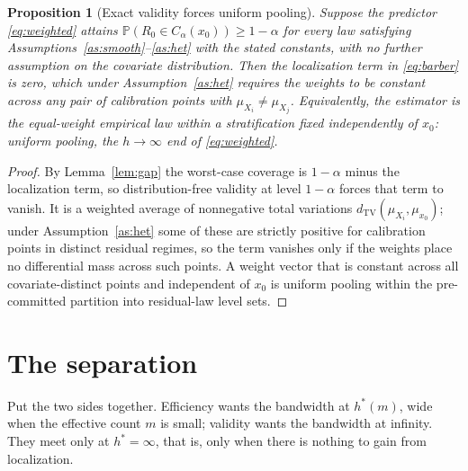 \documentclass[11pt]{article}
\newtheorem{proposition}[theorem]{Proposition}
\theoremstyle{definition}
\theoremstyle{remark}
\newcommand{\Prob}{\mathbb{P}}
\newcommand{\TV}{\mathrm{TV}}
\newcommand{\dtv}{d_{\TV}}
\begin{document}
\begin{proposition}[Exact validity forces uniform pooling]\label{prop:uniform}
Suppose the predictor \eqref{eq:weighted} attains $\Prob(R_0\in C_\alpha(x_0)) \ge 1-\alpha$
for every law satisfying Assumptions~\ref{as:smooth}--\ref{as:het} with the stated
constants, with no further assumption on the covariate distribution. Then the localization
term in \eqref{eq:barber} is zero, which under Assumption~\ref{as:het} requires the
weights to be constant across any pair of calibration points with $\mu_{X_i}\ne\mu_{X_j}$.
Equivalently, the estimator is the equal-weight empirical law within a stratification
fixed independently of $x_0$: uniform pooling, the $h\to\infty$ end of
\eqref{eq:weighted}.
\end{proposition}

\begin{proof}
By Lemma~\ref{lem:gap} the worst-case coverage is $1-\alpha$ minus the localization term,
so distribution-free validity at level $1-\alpha$ forces that term to vanish. It is a
weighted average of nonnegative total variations $\dtv(\mu_{X_i},\mu_{x_0})$; under
Assumption~\ref{as:het} some of these are strictly positive for calibration points in
distinct residual regimes, so the term vanishes only if the weights place no differential
mass across such points. A weight vector that is constant across all covariate-distinct
points and independent of $x_0$ is uniform pooling within the pre-committed partition into
residual-law level sets.
\end{proof}

\section{The separation}

Put the two sides together. Efficiency wants the bandwidth at $h^{*}(m)$, wide when the
effective count $m$ is small; validity wants the bandwidth at infinity. They meet only at
$h^{*}=\infty$, that is, only when there is nothing to gain from localization.
\end{document}
